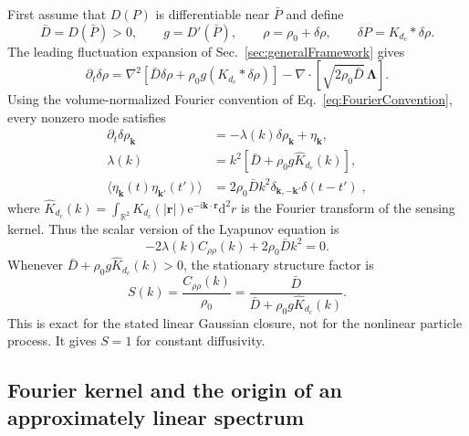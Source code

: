 \documentclass{article}
\begin{document}
First assume that $D(P)$ is differentiable near $\bar P$ and define
\begin{equation}
    \bar D=D(\bar P)>0,\qquad g=D'(\bar P),\qquad
    \rho=\rho_0+\delta\rho,\qquad \delta P=K_{d_c}*\delta\rho.
\end{equation}
The leading fluctuation expansion of Sec.~\ref{sec:generalFramework} gives
\begin{equation}
    \partial_t\delta\rho=\nabla^2[\bar D\delta\rho+\rho_0g(K_{d_c}*\delta\rho)]
    -\nabla\cdot[\sqrt{2\rho_0\bar D}\,\boldsymbol\Lambda].
    \label{eq:ffLinearSPDE}
\end{equation}
Using the volume-normalized Fourier convention of Eq.~\eqref{eq:FourierConvention}, every nonzero mode satisfies
\begin{align}
    \partial_t\delta\rho_{\mathbf k}&=-\lambda(k)\delta\rho_{\mathbf k}+\eta_{\mathbf k},\\
    \lambda(k)&=k^2[\bar D+\rho_0g\widehat K_{d_c}(k)],\\
    \langle\eta_{\mathbf k}(t)\eta_{\mathbf k'}(t')\rangle
    &=2\rho_0\bar D k^2\delta_{\mathbf k,-\mathbf k'}\delta(t-t')\;,
    \label{eq:ffOU}
\end{align}
where $\widehat{K}_{d_c}(k)=\int_{\mathbb{R} ^2}{K_{d_c}\left( \left| \mathbf{r} \right| \right) \mathrm{e}^{-\mathrm{i}\mathbf{k}\cdot \mathbf{r}}\mathrm{d}^2r}$ is the Fourier transform of the sensing kernel. 
Thus the scalar version of the Lyapunov equation is
\begin{equation}
    -2\lambda(k)C_{\rho\rho}(k)+2\rho_0\bar Dk^2=0.
\end{equation}
Whenever $\bar D+\rho_0g\widehat K_{d_c}(k)>0$, the stationary structure factor is
\begin{equation}
    \boxed{S(k)=\frac{C_{\rho\rho}(k)}{\rho_0}
    =\frac{\bar D}{\bar D+\rho_0g\widehat K_{d_c}(k)}.}
    \label{eq:ffSk}
\end{equation}
This is exact for the stated linear Gaussian closure, not for the nonlinear particle process. It gives $S=1$ for constant diffusivity.

\subsection{Fourier kernel and the origin of an approximately linear spectrum}
\end{document}
